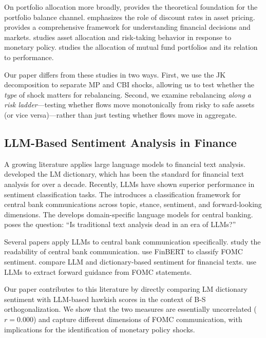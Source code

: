 \documentclass[11pt,a4paper]{article}
\begin{document}
On portfolio allocation more broadly, \citet{tobin1969general} provides the theoretical foundation for the portfolio balance channel. \citet{cochrane2011presidential} emphasizes the role of discount rates in asset pricing. \citet{campbell2017financial} provides a comprehensive framework for understanding financial decisions and markets. \citet{hau2016asset} studies asset allocation and risk-taking behavior in response to monetary policy. \citet{kacperczyk2008unobserved} studies the allocation of mutual fund portfolios and its relation to performance.

Our paper differs from these studies in two ways. First, we use the JK decomposition to separate MP and CBI shocks, allowing us to test whether the \textit{type} of shock matters for rebalancing. Second, we examine rebalancing \textit{along a risk ladder}---testing whether flows move monotonically from risky to safe assets (or vice versa)---rather than just testing whether flows move in aggregate.

\subsection{LLM-Based Sentiment Analysis in Finance}

A growing literature applies large language models to financial text analysis. \citet{loughran2011when} developed the LM dictionary, which has been the standard for financial text analysis for over a decade. Recently, LLMs have shown superior performance in sentiment classification tasks. The \citet{IMF2025llm} introduces a classification framework for central bank communications across topic, stance, sentiment, and forward-looking dimensions. The \citet{BIS2024cblms} develops domain-specific language models for central banking. \citet{cepr2026traditional} poses the question: ``Is traditional text analysis dead in an era of LLMs?''

Several papers apply LLMs to central bank communication specifically. \citet{hansen2018long} study the readability of central bank communication. \citet{acosta2024fomc} use FinBERT to classify FOMC sentiment. \citet{arora2024llm} compare LLM and dictionary-based sentiment for financial texts. \citet{kim2024llm} use LLMs to extract forward guidance from FOMC statements.

Our paper contributes to this literature by directly comparing LM dictionary sentiment with LLM-based hawkish scores in the context of B-S orthogonalization. We show that the two measures are essentially uncorrelated ($r = 0.000$) and capture different dimensions of FOMC communication, with implications for the identification of monetary policy shocks.
\end{document}
